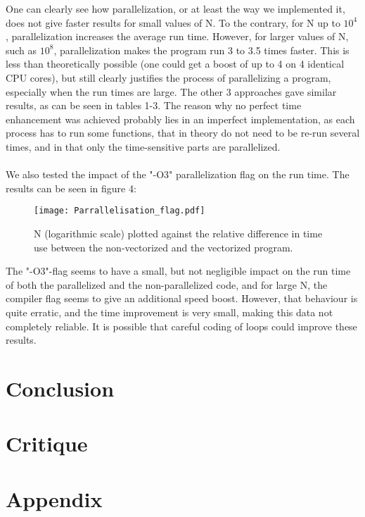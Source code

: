 \documentclass[10pt,a4paper]{article}
\begin{document}
One can clearly see how parallelization, or at least the way we implemented it, does not give faster results for small values of N. To the contrary, for N up to $10^4$, parallelization increases the average run time. However, for larger values of N, such as $10^8$, parallelization makes the program run 3 to 3.5 times faster. This is less than theoretically possible (one could get a boost of up to 4 on 4 identical CPU cores), but still clearly justifies the process of parallelizing a program, especially when the run times are large. The other 3 approaches gave similar results, as can be seen in tables 1-3. The reason why no perfect time enhancement was achieved probably lies in an imperfect implementation, as each process has to run some functions, that in theory do not need to be re-run several times, and in that only the time-sensitive parts are parallelized.\\\\
We also tested the impact of the "-O3" parallelization flag on the run time. The results can be seen in figure 4:
\begin{figure}[H]
\centering
\texttt{[image: Parrallelisation\_flag.pdf]}
\caption[Vectorization flags]{N (logarithmic scale) plotted against the relative difference in time use between the non-vectorized and the vectorized program. }
\end{figure}
The "-O3"-flag seems to have a small, but not negligible impact on the run time of both the parallelized and the non-parallelized code, and for large N, the compiler flag seems to give an additional speed boost.
However, that behaviour is quite erratic, and the time improvement is very small, making this data not completely reliable. It is possible that careful coding of loops could improve these results.
\section{Conclusion}

\section{Critique}

\section{Appendix}
\end{document}
